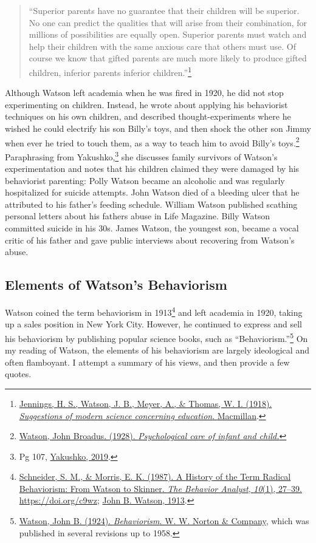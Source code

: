 \documentclass[
  oneside,
  12pt]{crumpbook}
\begin{document}
\begin{quote}
``Superior parents have no guarantee that their children will be superior. No one can predict the qualities that will arise from their combination, for millions of possibilities are equally open. Superior parents must watch and help their children with the same anxious care that others must use. Of course we know that gifted parents are much more likely to produce gifted children, inferior parents inferior children.''\footnote{\protect\hyperlink{ref-jenningsSuggestionsModernScience1918}{Jennings, H. S., Watson, J. B., Meyer, A., \& Thomas, W. I. (1918). \emph{Suggestions of modern science concerning education}. {Macmillan}}.}
\end{quote}

Although Watson left academia when he was fired in 1920, he did not stop experimenting on children. Instead, he wrote about applying his behaviorist techniques on his own children, and described thought-experiments where he wished he could electrify his son Billy's toys, and then shock the other son Jimmy when ever he tried to touch them, as a way to teach him to avoid Billy's toys.\footnote{\protect\hyperlink{ref-watsonPsychologicalCareInfant1928}{Watson, John Broadus. (1928). \emph{Psychological care of infant and child.}}} Paraphrasing from Yakushko,\footnote{Pg 107, \protect\hyperlink{ref-yakushkoScientificPollyannaismInquisition2019}{Yakushko, 2019}.} she discusses family survivors of Watson's experimentation and notes that his children claimed they were damaged by his behaviorist parenting: Polly Watson became an alcoholic and was regularly hospitalized for suicide attempts. John Watson died of a bleeding ulcer that he attributed to his father's feeding schedule. William Watson published scathing personal letters about his fathers abuse in Life Magazine. Billy Watson committed suicide in his 30s. James Watson, the youngest son, became a vocal critic of his father and gave public interviews about recovering from Watson's abuse.

\hypertarget{elements-of-watsons-behaviorism}{%
\subsection{Elements of Watson's Behaviorism}\label{elements-of-watsons-behaviorism}}

Watson coined the term behaviorism in 1913\footnote{\protect\hyperlink{ref-schneiderHistoryTermRadical1987}{Schneider, S. M., \& Morris, E. K. (1987). A {History} of the {Term Radical Behaviorism}: {From Watson} to {Skinner}. \emph{The Behavior Analyst}, \emph{10}(1), 27--39. \url{https://doi.org/c9wz}}; \protect\hyperlink{ref-watsonPsychologyBehavioristViews1913}{John B. Watson, 1913}.} and left academia in 1920, taking up a sales position in New York City. However, he continued to express and sell his behaviorism by publishing popular science books, such as ``Behaviorism.''\footnote{\protect\hyperlink{ref-watsonBehaviorism1924}{Watson, John B. (1924). \emph{Behaviorism}. {W. W. Norton \& Company}}, which was published in several revisions up to 1958.} On my reading of Watson, the elements of his behaviorism are largely ideological and often flamboyant. I attempt a summary of his views, and then provide a few quotes.
\end{document}
